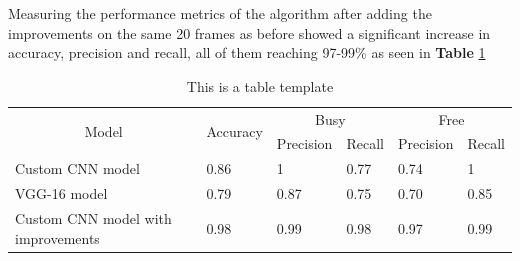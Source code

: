 \documentclass[12pt]{article}
\begin{document}
Measuring the performance metrics of the algorithm after adding the improvements on the same 20 frames as before showed a significant increase in accuracy, precision and recall, all of them reaching 97-99\% as seen in \textbf{Table} \ref{tab:metrics}

\begin{table}[htb]
  \begin{centering}
  \begin{tabular}{|l|l|l|l|l|l|}
  \hline
  \multicolumn{1}{|c|}{\multirow{2}{*}{Model}} & \multirow{2}{*}{Accuracy} & \multicolumn{2}{c|}{Busy} & \multicolumn{2}{c|}{Free} \\ \cline{3-6} 
  \multicolumn{1}{|c|}{}                       &                           & Precision     & Recall    & Precision     & Recall    \\ \hline
  Custom CNN model                             & 0.86                      & 1             & 0.77      & 0.74          & 1         \\ \hline
  VGG-16 model                                 & 0.79                      & 0.87          & 0.75      & 0.70          & 0.85    \\ \hline
  Custom CNN model with improvements           & 0.98                      & 0.99          & 0.98      & 0.97          & 0.99      \\ \hline
  \end{tabular}
  \caption{This is a table template}
  \label{tab:metrics}
  \end{centering}
  \end{table}
\end{document}
